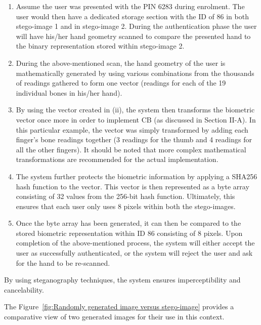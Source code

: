 \begin{enumerate}[label=\roman*.]
    
    \item  Assume the user was presented with the PIN 6283 during enrolment. The user would then have a dedicated storage section with the ID of 86 in both stego-image 1 and in stego-image 2. During the authentication phase the user will have his/her hand geometry scanned to compare the presented hand to the binary representation stored within stego-image 2. 
    
    \item  During the above-mentioned scan, the hand geometry of the user is mathematically generated by using various combinations from the thousands of readings gathered to form one vector (readings for each of the 19 individual bones in his/her hand).
    
    \item By using the vector created in (ii), the system then transforms the biometric vector once more in order to implement CB (as discussed in Section II-A). In this particular example, the vector was simply transformed by adding each finger’s bone readings together (3 readings for the thumb and 4 readings for all the other fingers). It should be noted that more complex mathematical transformations are recommended for the actual implementation.
    
    \item The system further protects the biometric information by applying a SHA256 hash function to the vector. This vector is then represented as a byte array consisting of 32 values from the 256-bit hash function. Ultimately, this ensures that each user only uses 8 pixels within both the stego-images.
    
    \item Once the byte array has been generated, it can then be compared to the stored biometric representation within ID 86 consisting of 8 pixels.
Upon completion of the above-mentioned process, the system will either accept the user as successfully authenticated, or the system will reject the user and ask for the hand to be re-scanned.

\end{enumerate}

By using steganography techniques, the system ensures imperceptibility and cancelability.

The Figure~\ref{fig:Randomly generated image versus stego-image} provides a comparative view of two generated images for their use in this context. 

